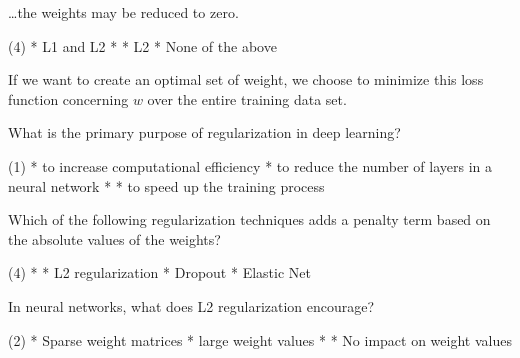 \documentclass[10pt]{extarticle}
\begin{document}
\begin{exercise}
    \dots the weights may be reduced to zero.
    \begin{choice}(4)
        * L1 and L2
        * 
        * L2
        * None of the above
    \end{choice}
\end{exercise}
\begin{solution}
\end{solution}

\begin{exercise}
    If we want to create an optimal set of weight, we choose to minimize this loss function concerning \(w\) over the entire training data set.
\end{exercise}
\begin{solution}
\end{solution}

\begin{exercise}
    What is the primary purpose of regularization in deep learning?
    \begin{choice}(1)
        * to increase computational efficiency
        * to reduce the number of layers in a neural network
        * 
        * to speed up the training process
    \end{choice}
\end{exercise}
\begin{solution}
\end{solution}

\begin{exercise}
    Which of the following regularization techniques adds a penalty term based on the absolute values of the weights?
    \begin{choice} (4)
        * 
        * L2 regularization
        * Dropout
        * Elastic Net
    \end{choice}
\end{exercise}
\begin{solution}
\end{solution}

\begin{exercise}
    In neural networks, what does L2 regularization encourage?
    \begin{choice} (2)
        * Sparse weight matrices
        * large weight values
        * 
        * No impact on weight values
    \end{choice}
\end{exercise}
\begin{solution}
\end{solution}
\end{document}
